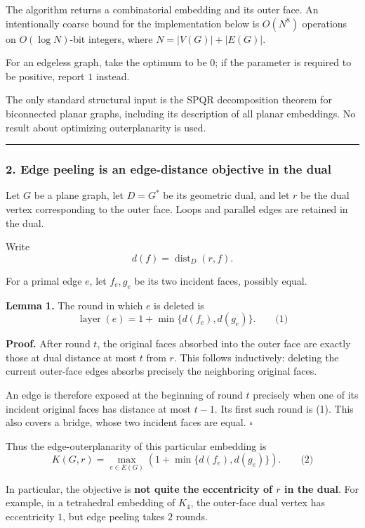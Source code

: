 \documentclass[
  11pt,
  a4paper,
]{article}
\begin{document}
The algorithm returns a combinatorial embedding and its outer face. An
intentionally coarse bound for the implementation below is \(O(N^8)\)
operations on \(O(\log N)\)-bit integers, where \(N=|V(G)|+|E(G)|\).

For an edgeless graph, take the optimum to be \(0\); if the parameter is
required to be positive, report \(1\) instead.

The only standard structural input is the SPQR decomposition theorem for
biconnected planar graphs, including its description of all planar
embeddings. No result about optimizing outerplanarity is used.

\begin{center}\rule{0.5\linewidth}{0.5pt}\end{center}

\subsubsection{2. Edge peeling is an edge-distance objective in the
dual}\label{edge-peeling-is-an-edge-distance-objective-in-the-dual}

Let \(G\) be a plane graph, let \(D=G^*\) be its geometric dual, and let
\(r\) be the dual vertex corresponding to the outer face. Loops and
parallel edges are retained in the dual.

Write \[
d(f)=\operatorname{dist}_D(r,f).
\]

For a primal edge \(e\), let \(f_e,g_e\) be its two incident faces,
possibly equal.

\textbf{Lemma 1.} The round in which \(e\) is deleted is \[
\operatorname{layer}(e)
=
1+\min\{d(f_e),d(g_e)\}.
\qquad\text{(1)}
\]

\textbf{Proof.} After round \(t\), the original faces absorbed into the
outer face are exactly those at dual distance at most \(t\) from \(r\).
This follows inductively: deleting the current outer-face edges absorbs
precisely the neighboring original faces.

An edge is therefore exposed at the beginning of round \(t\) precisely
when one of its incident original faces has distance at most \(t-1\).
Its first such round is (1). This also covers a bridge, whose two
incident faces are equal. \(\square\)

Thus the edge-outerplanarity of this particular embedding is \[
K(G,r)
=
\max_{e\in E(G)}
\left(1+\min\{d(f_e),d(g_e)\}\right).
\qquad\text{(2)}
\]

In particular, the objective is \textbf{not quite the eccentricity of
\(r\) in the dual}. For example, in a tetrahedral embedding of \(K_4\),
the outer-face dual vertex has eccentricity \(1\), but edge peeling
takes \(2\) rounds.
\end{document}
